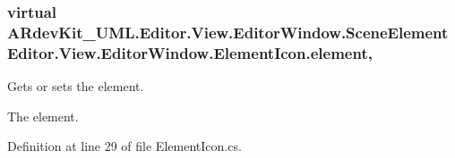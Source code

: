 \subsubsection[{element}]{\setlength{\rightskip}{0pt plus 5cm}virtual A\-Rdev\-Kit\-\_\-\-U\-M\-L.\-Editor.\-View.\-Editor\-Window.\-Scene\-Element Editor.\-View.\-Editor\-Window.\-Element\-Icon.\-element\hspace{0.3cm}{\ttfamily [get]}, {\ttfamily [set]}}\label{class_editor_1_1_view_1_1_editor_window_1_1_element_icon_a299decc6d6e4e2cc95bee1cb3f625e4c}


Gets or sets the element. 

The element. 

Definition at line 29 of file Element\-Icon.\-cs.

